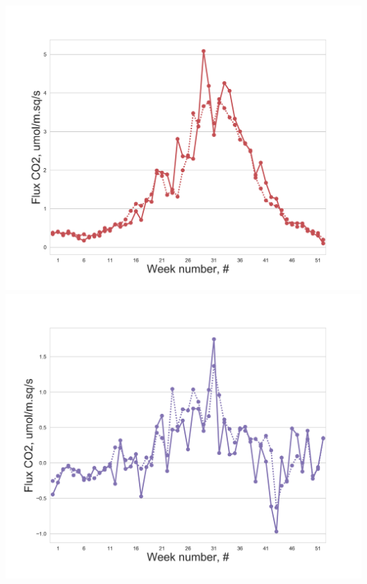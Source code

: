 \documentclass{beamer}
\begin{document}
\begin{frame}
\begin{columns}[t]
\centering
\includegraphics[width=\textwidth]{F_ML/2.png}\\
\includegraphics[width=\textwidth]{F_ML/3.png}
\end{columns}
\end{frame}
\end{document}
